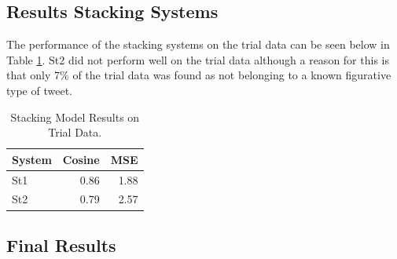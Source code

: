\documentclass[11pt,letterpaper]{article}
\begin{document}

\subsection{Results Stacking Systems}
The performance of the stacking systems on the trial data can be seen below in Table \ref{tbl:stackingResults}. {\sc St2} did not perform well on the trial data although a reason for this is that only 7\% of the trial data was found as not belonging to a known figurative type of tweet.

\begin{table}[ht!]
\begin{center}
\begin{tabular}{|l|r|r|}
\hline
System & Cosine & MSE\\
\hline
{\sc St1} & 0.86 &1.88\\
{\sc St2} & 0.79 & 2.57\\
\hline
\end{tabular}
\end{center}
\caption{Stacking Model Results on Trial Data.}
\label{tbl:stackingResults}
\end{table}
 
\subsection{Final Results} 
\end{document}
